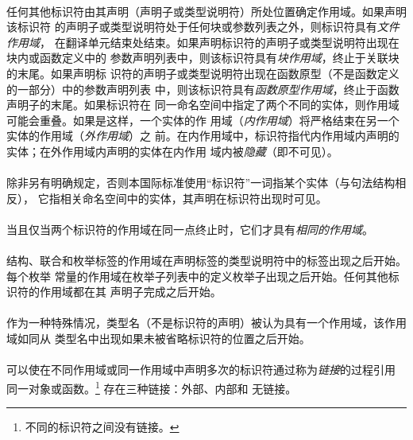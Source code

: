 {\paragraph{}
任何其他标识符由其声明（声明子或类型说明符）所处位置确定作用域。如果声明该标识符
的声明子或类型说明符处于任何块或参数列表之外，则标识符具有\textit{文件作用域}，
在翻译单元结束处结束。如果声明标识符的声明子或类型说明符出现在块内或函数定义中的
参数声明列表中，则该标识符具有\textit{块作用域}，终止于关联块的末尾。如果声明标
识符的声明子或类型说明符出现在函数原型（不是函数定义的一部分）中的参数声明列表
中，则该标识符具有\textit{函数原型作用域}，终止于函数声明子的末尾。如果标识符在
同一命名空间中指定了两个不同的实体，则作用域可能会重叠。如果是这样，一个实体的作
用域（\textit{内作用域}）将严格结束在另一个实体的作用域（\textit{外作用域}）之
前。在内作用域中，标识符指代内作用域内声明的实体；在外作用域内声明的实体在内作用
域内被\textit{隐藏}（即不可见）。

\paragraph{}
除非另有明确规定，否则本国际标准使用``标识符''一词指某个实体（与句法结构相反），
它指相关命名空间中的实体，其声明在标识符出现时可见。

\paragraph{}
当且仅当两个标识符的作用域在同一点终止时，它们才具有\textit{相同的作用域}。

\paragraph{}
结构、联合和枚举标签的作用域在声明标签的类型说明符中的标签出现之后开始。每个枚举
常量的作用域在枚举子列表中的定义枚举子出现之后开始。任何其他标识符的作用域都在其
声明子完成之后开始。

\paragraph{}
作为一种特殊情况，类型名（不是标识符的声明）被认为具有一个作用域，该作用域如同从
类型名中出现如果未被省略标识符的位置之后开始。


\paragraph{}
可以使在不同作用域或同一作用域中声明多次的标识符通过称为\textit{链接}的过程引用
同一对象或函数。\footnote{不同的标识符之间没有链接。} 存在三种链接：外部、内部和
无链接。

}
